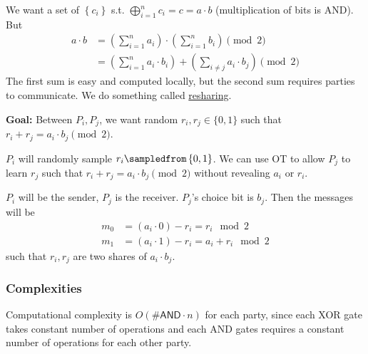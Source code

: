 We want a set of $\left\{ c_i \right\}$ s.t. $\bigoplus^n_{i=1}c_i = c = a \cdot b$ (multiplication of bits is \textsf{AND}). But
\begin{align*}
    a\cdot b
     & = \left( \sum^n_{i=1}a_i \right)\cdot \left( \sum^n_{i=1}b_i \right)\pmod{2}                \\
     & = \left( \sum^n_{i=1}a_i \cdot b_i \right) + \left( \sum_{i\neq j}a_i \cdot b_j \right)\pmod{2}
\end{align*}
The first sum is easy and computed locally, but the second sum requires parties to communicate. We do something called \ul{resharing}.

\textbf{Goal:} Between $P_i, P_j$, we want random $r_i, r_j\in\{0, 1\}$ such that $r_i + r_j = a_i \cdot b_j \pmod{2}$.

$P_i$ will randomly sample $r_i\sampledfrom \left\{ 0, 1 \right\}$. We can use OT to allow $P_j$ to learn $r_j$ such that $r_i + r_j = a_i\cdot b_j\pmod{2}$ without revealing $a_i$ or $r_i$.

$P_i$ will be the sender, $P_j$ is the receiver. $P_j$'s choice bit is $b_j$. Then the messages will be
\begin{align*}
    m_0 & = (a_i\cdot 0) - r_i = r_i \mod 2\\
    m_1 & = (a_i\cdot 1) - r_i = a_i + r_i \mod 2
\end{align*}
such that $r_i, r_j$ are two shares of $a_i\cdot b_j$.


\subsubsection{Complexities}
Computational complexity is $O(\#\mathsf{AND}\cdot n)$ for each party, since each XOR gate takes constant number of operations and each AND gates requires a constant number of operations for each other party.

